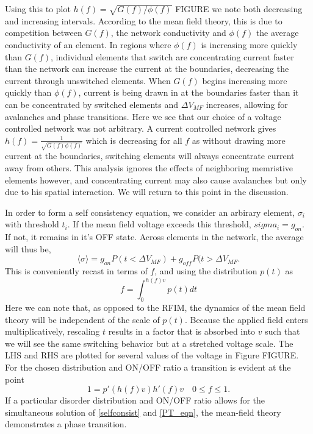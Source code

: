 \documentclass[aps,prl,preprint,groupedaddress]{revtex4-1}
\begin{document}
Using this to plot $h(f) = \sqrt{G(f)/\phi(f)}$ FIGURE we note both decreasing
and increasing intervals.  According to the mean field theory, this is due
to competition between $G(f)$, the network conductivity and $\phi(f)$ the
average conductivity of an element.  In regions where $\phi(f)$ is increasing
more quickly than $G(f)$, individual elements that switch are concentrating
current faster
than the network can increase the current at the boundaries, decreasing the
current through unswitched elements.  When $G(f)$ begins increasing more
quickly than $\phi(f)$, current is being drawn in at the boundaries faster
than it can be concentrated by switched elements and $\Delta V_{MF}$ increases,
allowing for avalanches and phase transitions. Here we see that our choice of
a voltage controlled network was not arbitrary.  A current controlled network
gives $h(f) = \frac{1}{\sqrt{G(f)\phi(f)}}$ which is decreasing for all $f$
as without
drawing more current at the boundaries, switching elements will always
concentrate current away from others. This analysis ignores the effects of
neighboring memristive elements however, and concentrating current may also
cause avalanches but only due to his spatial interaction.  We will return
to this point in the discussion.

In order to form a self consistency equation, we consider an arbirary element,
$\sigma_i$ with threshold $t_i$.  If the mean field voltage exceeds this
threshold, $sigma_i = g_{on}$. If not, it remains in it's OFF state. Across
elements in the network, the average will thus be,
\[\langle \sigma \rangle = g_{on} P(t < \Delta V_{MF}) + 
g_{off} P(t> \Delta V_{MF}.\]
This is conveniently recast in terms of $f$, and using the distribution
$p(t)$ as
\begin{equation}\label{selfconsist}
f = \int_0^{h(f) v} p(t) dt
\end{equation}
Here we can note that, as opposed to the RFIM, the
dynamics of the
mean field theory will be independent of the scale of $p(t)$.  Because the
applied field enters multiplicatively, rescaling $t$ results in a factor that
is absorbed into $v$ such that we will see the same switching behavior but
at a stretched voltage scale. The LHS and
RHS are plotted for several values of the voltage in Figure FIGURE.  For
the chosen distribution and ON/OFF ratio a transition is evident at the
point
\begin{equation}\label{PT_eqn}
1 = p'(h(f)v)h'(f)v \quad 0\le f\le 1.
\end{equation}
If a particular disorder distribution and ON/OFF ratio allows for the
simultaneous solution of \ref{selfconsist} and \ref{PT_eqn}, the mean-field
theory demonstrates a phase transition.
\end{document}
